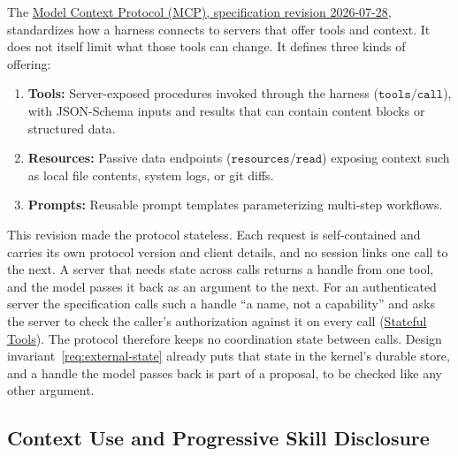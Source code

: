 The \href{https://modelcontextprotocol.io/specification/2026-07-28}{Model Context Protocol (MCP), specification revision 2026-07-28}, standardizes how a harness connects to servers that offer tools and context. It does not itself limit what those tools can change. It defines three kinds of offering:
\begin{enumerate}[leftmargin=1.8em,itemsep=2pt]
  \item \textbf{Tools:} Server-exposed procedures invoked through the harness ($\mathtt{tools/call}$), with JSON-Schema inputs and results that can contain content blocks or structured data.
  \item \textbf{Resources:} Passive data endpoints ($\mathtt{resources/read}$) exposing context such as local file contents, system logs, or git diffs.
  \item \textbf{Prompts:} Reusable prompt templates parameterizing multi-step workflows.
\end{enumerate}
This revision made the protocol stateless. Each request is self-contained and
carries its own protocol version and client details, and no session
links one call to the next. A server that needs state across calls returns a
handle from one tool, and the model passes it back as an argument to the next.
For an authenticated server the specification calls such a handle ``a name,
not a capability'' and asks the server to check the caller's authorization
against it on every call
(\href{https://modelcontextprotocol.io/specification/2026-07-28/server/tools}{Stateful
Tools}). The protocol therefore keeps no coordination state between calls.
Design invariant~\ref{req:external-state} already puts that state in the
kernel's durable store, and a handle the model passes back is part of a
proposal, to be checked like any other argument.

\subsection{Context Use and Progressive Skill Disclosure}

